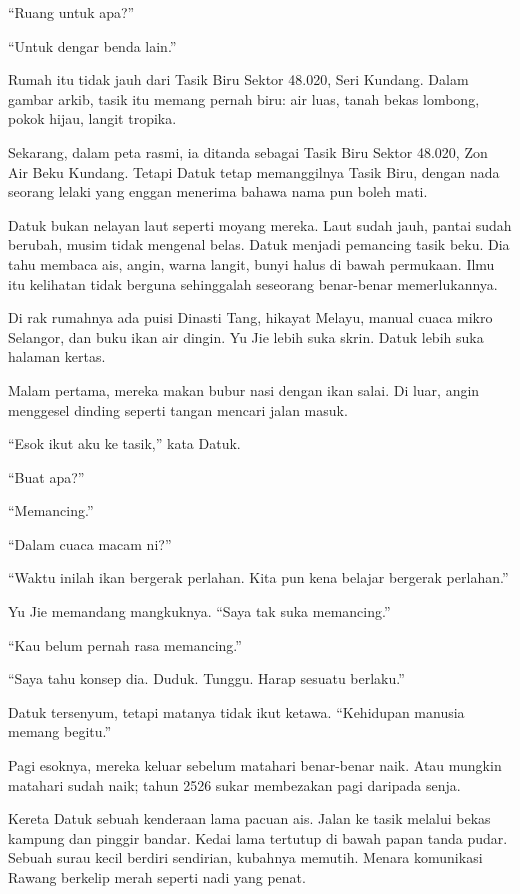 \documentclass[
  11pt,
  a5paper,
  openany,
  oneside]{book}
\begin{document}
``Ruang untuk apa?''

``Untuk dengar benda lain.''

Rumah itu tidak jauh dari Tasik Biru Sektor 48.020, Seri Kundang. Dalam
gambar arkib, tasik itu memang pernah biru: air luas, tanah bekas
lombong, pokok hijau, langit tropika.

Sekarang, dalam peta rasmi, ia ditanda sebagai Tasik Biru Sektor 48.020,
Zon Air Beku Kundang. Tetapi Datuk tetap memanggilnya Tasik Biru, dengan
nada seorang lelaki yang enggan menerima bahawa nama pun boleh mati.

Datuk bukan nelayan laut seperti moyang mereka. Laut sudah jauh, pantai
sudah berubah, musim tidak mengenal belas. Datuk menjadi pemancing tasik
beku. Dia tahu membaca ais, angin, warna langit, bunyi halus di bawah
permukaan. Ilmu itu kelihatan tidak berguna sehinggalah seseorang
benar-benar memerlukannya.

Di rak rumahnya ada puisi Dinasti Tang, hikayat Melayu, manual cuaca
mikro Selangor, dan buku ikan air dingin. Yu Jie lebih suka skrin. Datuk
lebih suka halaman kertas.

Malam pertama, mereka makan bubur nasi dengan ikan salai. Di luar, angin
menggesel dinding seperti tangan mencari jalan masuk.

``Esok ikut aku ke tasik,'' kata Datuk.

``Buat apa?''

``Memancing.''

``Dalam cuaca macam ni?''

``Waktu inilah ikan bergerak perlahan. Kita pun kena belajar bergerak
perlahan.''

Yu Jie memandang mangkuknya. ``Saya tak suka memancing.''

``Kau belum pernah rasa memancing.''

``Saya tahu konsep dia. Duduk. Tunggu. Harap sesuatu berlaku.''

Datuk tersenyum, tetapi matanya tidak ikut ketawa. ``Kehidupan manusia
memang begitu.''

Pagi esoknya, mereka keluar sebelum matahari benar-benar naik. Atau
mungkin matahari sudah naik; tahun 2526 sukar membezakan pagi daripada
senja.

Kereta Datuk sebuah kenderaan lama pacuan ais. Jalan ke tasik melalui
bekas kampung dan pinggir bandar. Kedai lama tertutup di bawah papan
tanda pudar. Sebuah surau kecil berdiri sendirian, kubahnya memutih.
Menara komunikasi Rawang berkelip merah seperti nadi yang penat.
\end{document}
